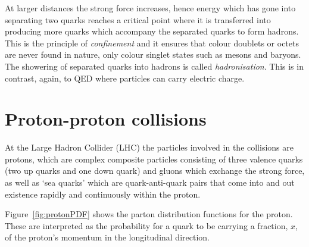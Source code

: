 
At larger distances the strong force increases, hence energy which has gone into separating two quarks reaches a critical point where it is transferred into producing more quarks which accompany the separated quarks to form hadrons. This is the principle of \emph{confinement} and it ensures that colour doublets or octets are never found in nature, only colour singlet states such as mesons and baryons. The showering of separated quarks into hadrons is called \emph{hadronisation}. This is in contrast, again, to QED where particles can carry electric charge.


\section{Proton-proton collisions}
At the Large Hadron Collider (LHC) the particles involved in the collisions are protons, which are complex composite particles consisting of three valence quarks (two up quarks and one down quark) and gluons which exchange the strong force, as well as `sea quarks' which are quark-anti-quark pairs that come into and out existence rapidly and continuously within the proton.

Figure~\ref{fig:protonPDF} shows the parton distribution functions for the proton. These are interpreted as the probability for a quark to be carrying a fraction, $x$, of the proton's momentum in the longitudinal direction.

